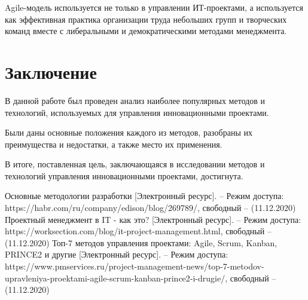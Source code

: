 \documentclass[a4paper,14pt]{extarticle}
\begin{document}
 	Agile-модель используется не только в управлении ИТ-проектами, а используется как эффективная практика организации труда небольших групп и творческих команд вместе с либеральными и демократическими методами менеджмента.
 	
 	
 	\newpage
 	\section{Заключение}
 	
 	В данной работе был проведен анализ наиболее популярных методов и технологий, используемых для управления инновационными проектами. 
 	
 	Были даны основные положения каждого из методов, разобраны их преимущества и недостатки, а также место их применения.
 	
 	В итоге, поставленная цель, заключающаяся в исследовании
 	методов и технологий управления инновационными проектами, достигнута.
 	
 	\newpage
 	
 	
 	\begin{thebibliography}{3}
 		Основные методологии разработки [Электронный ресурс]. – Режим доступа: 
 		https://habr.com/ru/company/edison/blog/269789/, 
 		свободный – (11.12.2020)
 		 Проектный менеджмент
 		в IT - как это? [Электронный ресурс]. – Режим доступа: 
 		https://worksection.com/blog/it-project-management.html, 
 		свободный – (11.12.2020)
 		 Топ-7 методов управления проектами: Agile, Scrum, Kanban, PRINCE2 и другие [Электронный ресурс]. – Режим доступа: 
 		https://www.pmservices.ru/project-management-news/top-7-metodov-upravleniya-proektami-agile-scrum-kanban-prince2-i-drugie/, 
 		свободный – (11.12.2020)
 	\end{thebibliography}
 	
 
\end{document}

